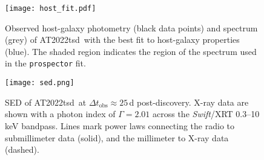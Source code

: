 \documentclass{nature_plusfigure}
\newcommand{\at}{AT2022tsd}
\begin{document}
\begin{supplement}
\begin{figure}[!ht]
 \centering
\texttt{[image: host\_fit.pdf]}
  \caption{Observed host-galaxy photometry (black data points) and spectrum (grey) of \at\ with the best fit to host-galaxy properties (blue). The shaded region indicates the region of the spectrum used in the \texttt{prospector} fit.
}
 \label{fig:host-fit}
\end{figure}

\begin{figure}[!ht]
 \centering
\texttt{[image: sed.png]}
  \caption{SED of \at\ at $\Delta t_\mathrm{obs}\approx25\,$d post-discovery. X-ray data are shown with a photon index of $\Gamma=2.01$ across the {\it Swift}/XRT 0.3--10\,keV bandpass. Lines mark power laws connecting the radio to submillimeter data (solid), and the millimeter to X-ray data (dashed).}
 \label{fig:full-sed}
\end{figure}


\end{supplement}
\end{document}
